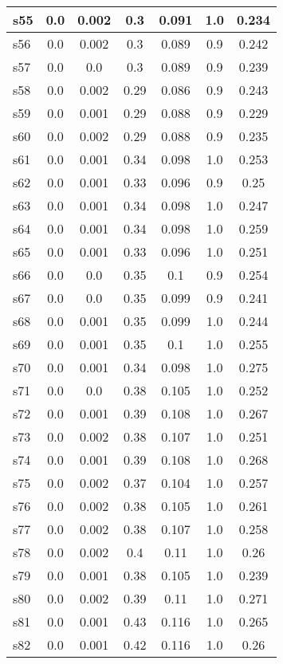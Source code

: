 \documentclass{article}
\begin{document}
\begin{tabular}{|l|c|c|c|c|c|c|}
\hline
s55 &0.0 & 0.002 & 0.3 & 0.091 & 1.0 & 0.234\\
\hline
s56 &0.0 & 0.002 & 0.3 & 0.089 & 0.9 & 0.242\\
\hline
s57 &0.0 & 0.0 & 0.3 & 0.089 & 0.9 & 0.239\\
\hline
s58 &0.0 & 0.002 & 0.29 & 0.086 & 0.9 & 0.243\\
\hline
s59 &0.0 & 0.001 & 0.29 & 0.088 & 0.9 & 0.229\\
\hline
s60 &0.0 & 0.002 & 0.29 & 0.088 & 0.9 & 0.235\\
\hline
s61 &0.0 & 0.001 & 0.34 & 0.098 & 1.0 & 0.253\\
\hline
s62 &0.0 & 0.001 & 0.33 & 0.096 & 0.9 & 0.25\\
\hline
s63 &0.0 & 0.001 & 0.34 & 0.098 & 1.0 & 0.247\\
\hline
s64 &0.0 & 0.001 & 0.34 & 0.098 & 1.0 & 0.259\\
\hline
s65 &0.0 & 0.001 & 0.33 & 0.096 & 1.0 & 0.251\\
\hline
s66 &0.0 & 0.0 & 0.35 & 0.1 & 0.9 & 0.254\\
\hline
s67 &0.0 & 0.0 & 0.35 & 0.099 & 0.9 & 0.241\\
\hline
s68 &0.0 & 0.001 & 0.35 & 0.099 & 1.0 & 0.244\\
\hline
s69 &0.0 & 0.001 & 0.35 & 0.1 & 1.0 & 0.255\\
\hline
s70 &0.0 & 0.001 & 0.34 & 0.098 & 1.0 & 0.275\\
\hline
s71 &0.0 & 0.0 & 0.38 & 0.105 & 1.0 & 0.252\\
\hline
s72 &0.0 & 0.001 & 0.39 & 0.108 & 1.0 & 0.267\\
\hline
s73 &0.0 & 0.002 & 0.38 & 0.107 & 1.0 & 0.251\\
\hline
s74 &0.0 & 0.001 & 0.39 & 0.108 & 1.0 & 0.268\\
\hline
s75 &0.0 & 0.002 & 0.37 & 0.104 & 1.0 & 0.257\\
\hline
s76 &0.0 & 0.002 & 0.38 & 0.105 & 1.0 & 0.261\\
\hline
s77 &0.0 & 0.002 & 0.38 & 0.107 & 1.0 & 0.258\\
\hline
s78 &0.0 & 0.002 & 0.4 & 0.11 & 1.0 & 0.26\\
\hline
s79 &0.0 & 0.001 & 0.38 & 0.105 & 1.0 & 0.239\\
\hline
s80 &0.0 & 0.002 & 0.39 & 0.11 & 1.0 & 0.271\\
\hline
s81 &0.0 & 0.001 & 0.43 & 0.116 & 1.0 & 0.265\\
\hline
s82 &0.0 & 0.001 & 0.42 & 0.116 & 1.0 & 0.26\\

\end{tabular}
\end{document}
